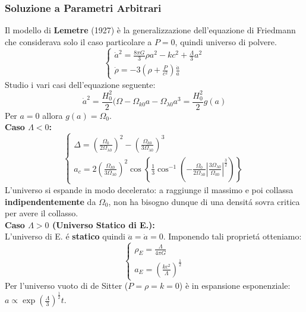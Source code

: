 \documentclass[12pt, a4paper]{article}
\begin{document}
\subsubsection{Soluzione a Parametri Arbitrari}
Il modello di \textbf{Lemetre} (1927) è la generalizzazione dell'equazione di Friedmann che considerava solo il caso particolare a $P=0$, quindi universo di polvere.
\begin{equation}
     \begin{cases}
          \dot{a}^2 = \frac{8 \pi G}{3} \rho a^2 - kc^2 + \frac{\Lambda}{3} a^2
         \\
         \dot{\rho}=-3(\rho+\frac{P}{c^2})\frac{\dot{a}}{a}
     \end{cases}
\end{equation}
Studio i vari casi dell'equazione seguente:
\begin{equation}
    \dot{a}^2=\frac{H_0^2}{2}(\Omega-\Omega_{k0}a-\Omega_{\lambda0}a^3
    =\frac{H_0^2}{2}g(a)
\end{equation}
Per $a=0$ allora $g(a)=\Omega_0$.\\
\textbf{Caso $\Lambda<0$:}\\
\begin{equation}
     \begin{cases}
          \Delta=(\frac{\Omega_0}{2\Omega_{\lambda0}})^2-(\frac{\Omega_{k0}}{3\Omega_{\lambda0}})^3
         \\
         a_c=2(\frac{\Omega_{k0}}{3\Omega_{\lambda0}})^2 \cos{\left\{\frac{1}{3}\cos^{-1}{(-\frac{\Omega_0}{2\Omega_{\lambda0}}|\frac{3\Omega_{\lambda0}}{\Omega_{k0}}|^\frac{3}{2})}\right\}}
     \end{cases}
\end{equation}
L'universo si espande in modo decelerato: a raggiunge il massimo e poi collassa \textbf{indipendentemente} da $\Omega_0$, non ha bisogno dunque di una densit\'{a} sovra critica per avere il collasso.\\
\textbf{Caso $\Lambda>0$ (Universo Statico di E.):}\\
L'universo di E. \'{e} \textbf{statico} quindi $\ddot{a}=\dot{a}=0$. Imponendo tali propriet\'{a} otteniamo:
\begin{equation}
     \begin{cases}
          \rho_E=\frac{\Lambda}{4\pi G}
         \\
         a_E=(\frac{kc^2}{\Lambda})^\frac{1}{2}
     \end{cases}
\end{equation}
Per l'universo vuoto di de Sitter ($P=\rho=k=0$) è in espansione esponenziale: $a\propto \exp{(\frac{\Lambda}{3})^\frac{1}{2}t}$.
\end{document}
